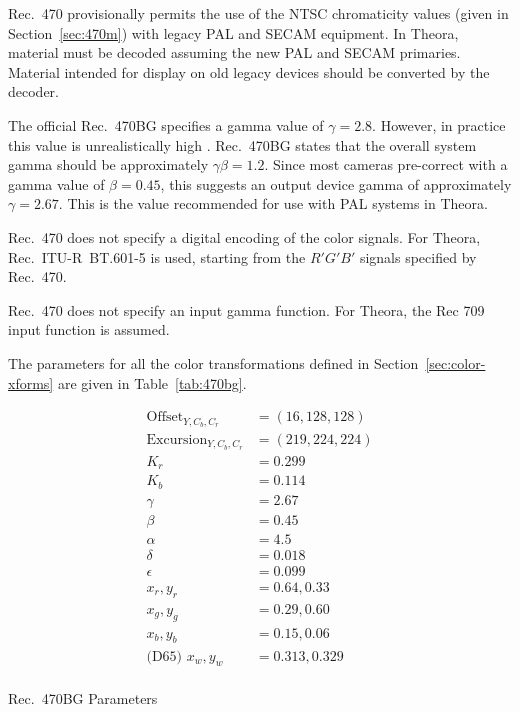 \documentclass[9pt,letterpaper]{book}
\numberwithin{equation}{chapter}
\numberwithin{figure}{chapter}
\numberwithin{table}{chapter}
\begin{document}
Rec.~470 provisionally permits the use of the NTSC chromaticity values (given
 in Section~\ref{sec:470m}) with legacy PAL and SECAM equipment.
In Theora, material must be decoded assuming the new PAL and SECAM primaries.
Material intended for display on old legacy devices should be converted by the
 decoder.

The official Rec.~470BG specifies a gamma value of $\gamma=2.8$.
However, in practice this value is unrealistically high \cite{Poyn97}.
Rec.~470BG states that the overall system gamma should be approximately
 $\gamma\beta=1.2$.
Since most cameras pre-correct with a gamma value of $\beta=0.45$,
 this suggests an output device gamma of approximately $\gamma=2.67$.
This is the value recommended for use with PAL systems in Theora.

Rec.~470 does not specify a digital encoding of the color signals.
For Theora, Rec.~ITU-R~BT.601-5 \cite{rec601} is used, starting from the
 $R'G'B'$ signals specified by Rec.~470.

Rec.~470 does not specify an input gamma function.
For Theora, the Rec 709 \cite{rec709} input function is assumed.

The parameters for all the color transformations defined in
 Section~\ref{sec:color-xforms} are given in Table~\ref{tab:470bg}.

\begin{table}[htb]
\begin{align*}
\mathrm{Offset}_{Y,C_b,C_r}    & = (16, 128, 128)  \\
\mathrm{Excursion}_{Y,C_b,C_r} & = (219, 224, 224) \\
K_r                            & = 0.299           \\
K_b                            & = 0.114           \\
\gamma                         & = 2.67            \\
\beta                          & = 0.45            \\
\alpha                         & = 4.5             \\
\delta                         & = 0.018           \\
\epsilon                       & = 0.099           \\
x_r,y_r                        & = 0.64, 0.33      \\
x_g,y_g                        & = 0.29, 0.60      \\
x_b,y_b                        & = 0.15, 0.06      \\
\text{(D65) } x_w,y_w          & = 0.313, 0.329    \\
\end{align*}
\caption{Rec.~470BG Parameters}
\label{tab:470bg}
\end{table}
\end{document}
